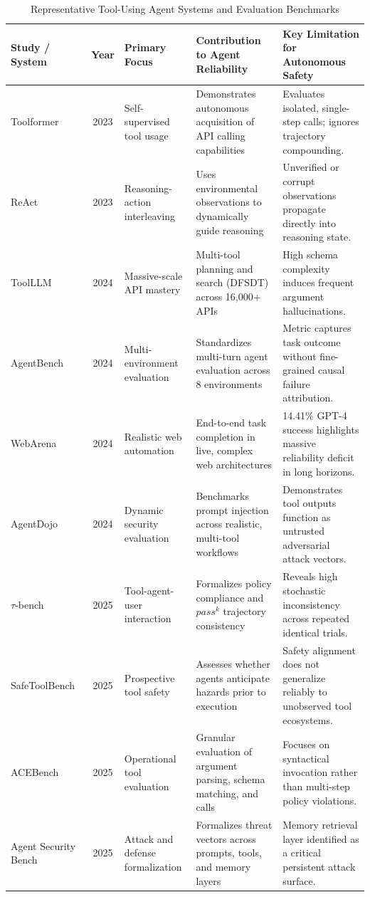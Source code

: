 \documentclass[conference]{IEEEtran}
\begin{document}
\begin{table}[t]
\caption{Representative Tool-Using Agent Systems and Evaluation Benchmarks}
\label{tab:systems_benchmarks}
\centering
\footnotesize
\renewcommand{\arraystretch}{1.2}
\begin{tabular}{p{2.6cm}cp{3.4cm}p{4.6cm}p{4.4cm}}
\toprule
\textbf{Study / System} & \textbf{Year} & \textbf{Primary Focus} & \textbf{Contribution to Agent Reliability} & \textbf{Key Limitation for Autonomous Safety} \\
\midrule
Toolformer~\cite{schick2023toolformer} & 2023 & Self-supervised tool usage & Demonstrates autonomous acquisition of API calling capabilities & Evaluates isolated, single-step calls; ignores trajectory compounding. \\
ReAct~\cite{yao2023react} & 2023 & Reasoning-action interleaving & Uses environmental observations to dynamically guide reasoning & Unverified or corrupt observations propagate directly into reasoning state. \\
ToolLLM~\cite{qin2024toolllm} & 2024 & Massive-scale API mastery & Multi-tool planning and search (DFSDT) across 16,000+ APIs & High schema complexity induces frequent argument hallucinations. \\
AgentBench~\cite{liu2024agentbench} & 2024 & Multi-environment evaluation & Standardizes multi-turn agent evaluation across 8 environments & Metric captures task outcome without fine-grained causal failure attribution. \\
WebArena~\cite{zhou2024webarena} & 2024 & Realistic web automation & End-to-end task completion in live, complex web architectures & 14.41\% GPT-4 success highlights massive reliability deficit in long horizons. \\
AgentDojo~\cite{debenedetti2024agentdojo} & 2024 & Dynamic security evaluation & Benchmarks prompt injection across realistic, multi-tool workflows & Demonstrates tool outputs function as untrusted adversarial attack vectors. \\
$\tau$-bench~\cite{yao2025taubench} & 2025 & Tool-agent-user interaction & Formalizes policy compliance and $pass^k$ trajectory consistency & Reveals high stochastic inconsistency across repeated identical trials. \\
SafeToolBench~\cite{xia2025safetoolbench} & 2025 & Prospective tool safety & Assesses whether agents anticipate hazards prior to execution & Safety alignment does not generalize reliably to unobserved tool ecosystems. \\
ACEBench~\cite{chen2025acebench} & 2025 & Operational tool evaluation & Granular evaluation of argument parsing, schema matching, and calls & Focuses on syntactical invocation rather than multi-step policy violations. \\
Agent Security Bench~\cite{zhang2025asb} & 2025 & Attack and defense formalization & Formalizes threat vectors across prompts, tools, and memory layers & Memory retrieval layer identified as a critical persistent attack surface. \\
\bottomrule
\end{tabular}
\end{table}
\end{document}

